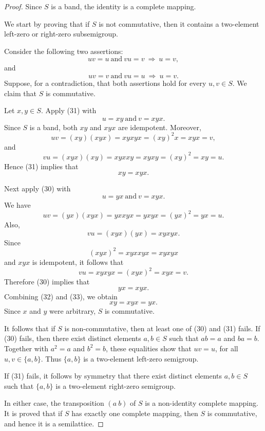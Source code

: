 \documentclass[10pt,a4paper]{amsart}
\begin{document}
\begin{proof}
    Since $S$ is a band, 
    the identity is a complete mapping.

    We start by proving that if $S$ is not commutative, then it contains a two-element left-zero or right-zero
    subsemigroup.

    Consider the following two assertions:
    \[
        uv=u\ \text{and}\ vu=v
        \ \Rightarrow\ 
        u=v,
        \tag{30}
    \]
    and
    \[
        uv=v\ \text{and}\ vu=u
        \ \Rightarrow\ 
        u=v.
        \tag{31}
    \]
    Suppose, for a contradiction, that both assertions hold for every
    $u,v\in S$. We claim  that $S$ is commutative.

    Let $x,y\in S$. Apply (31) with
    \[
        u=xy
        \ \text{and}\ 
        v=xyx.
    \]
    Since $S$ is a band, both $xy$ and $xyx$ are
    idempotent. Moreover,
    \[
        uv=(xy)(xyx)=xyxyx=(xy)^2x=xyx=v,
    \]
    and
    \[
        vu=(xyx)(xy)=xyxxy=xyxy=(xy)^2=xy=u.
    \]
    Hence (31) implies that
    \[
        xy=xyx.
        \tag{32}
    \]

    Next apply (30) with
    \[
        u=yx
        \ \text{and}\ 
        v=xyx.
    \]
    We have
    \[
        uv=(yx)(xyx)=yxxyx=yxyx=(yx)^2=yx=u.
    \]
    Also,
    \[
        vu=(xyx)(yx)=xyxyx.
    \]
    Since
    \[
        (xyx)^2=xyxxyx=xyxyx
    \]
    and $xyx$ is idempotent, it follows that
    \[
        vu=xyxyx=(xyx)^2=xyx=v.
    \]
    Therefore (30) implies that
    \[
        yx=xyx.
        \tag{33}
    \]
    Combining (32) and (33), we obtain
    \[
        xy=xyx=yx.
    \]
    Since $x$ and $y$ were arbitrary, $S$ is commutative.

    It follows that if $S$ is non-commutative, then at least one of (30)
    and (31) fails. If (30) fails, then there exist distinct elements
    $a,b\in S$ such that
   $ab=a$
        and $ba=b$. 
    Together with $a^2=a$ and $b^2=b$, these equalities show that
   $uv=u$, 
    for all $u,v\in\{a,b\}$. Thus $\{a,b\}$ is a two-element left-zero
    semigroup.

    If (31) fails, it follows by symmetry that  there exist distinct elements
$a,b\in S$ such that $\{a,b\}$ is a two-element right-zero semigroup.

    In either case, the transposition $(a\ b)$ of $S$  is a non-identity complete mapping.
It is proved that if $S$ has exactly one complete mapping, then $S$ is
commutative, and hence it is a semilattice.


\end{proof}
\end{document}
